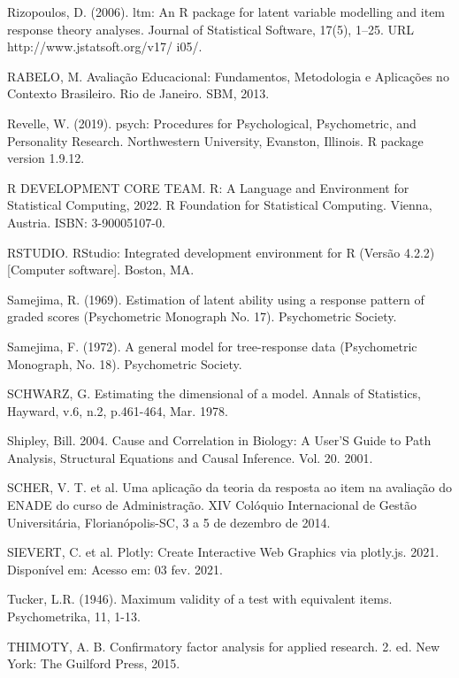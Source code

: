 \documentclass[12pt]{article}
\begin{document}
Rizopoulos, D. (2006). ltm: An R package for latent variable modelling and item response theory analyses. Journal of Statistical Software, 17(5), 1–25. URL http://www.jstatsoft.org/v17/ i05/.

RABELO, M. Avaliação Educacional: Fundamentos, Metodologia e Aplicações no Contexto Brasileiro. Rio de Janeiro. SBM, 2013.

Revelle, W. (2019). psych: Procedures for Psychological, Psychometric, and Personality Research. Northwestern University, Evanston, Illinois. R package version 1.9.12.

R DEVELOPMENT CORE TEAM. R: A Language and Environment for Statistical Computing, 2022. R Foundation for Statistical Computing. Vienna, Austria. ISBN: 3-90005107-0. 

RSTUDIO. RStudio: Integrated development environment for R (Versão 4.2.2) [Computer software]. Boston, MA. 

Samejima, R. (1969). Estimation of latent ability using a response pattern of graded scores (Psychometric Monograph No. 17). Psychometric Society. 

Samejima, F. (1972). A general model for tree-response data (Psychometric Monograph, No. 18). Psychometric Society. 

SCHWARZ, G. Estimating the dimensional of a model. Annals of Statistics, Hayward, v.6, n.2,
p.461-464, Mar. 1978.

Shipley, Bill. 2004. Cause and Correlation in Biology: A User’S Guide to Path Analysis, Structural Equations and Causal Inference. Vol. 20. 2001.

SCHER, V. T. et al. Uma aplicação da teoria da resposta ao item na avaliação do ENADE do curso de Administração. XIV Colóquio Internacional de Gestão Universitária, Florianópolis-SC, 3 a 5 de dezembro de 2014.

SIEVERT, C. et al. Plotly: Create Interactive Web Graphics via plotly.js. 2021. Disponível em: Acesso em: 03 fev. 2021.

Tucker, L.R. (1946). Maximum validity of a test with equivalent items. Psychometrika, 11, 1-13. 

THIMOTY, A. B. Confirmatory factor analysis for applied research. 2. ed. New York: The Guilford Press, 2015.
\end{document}

